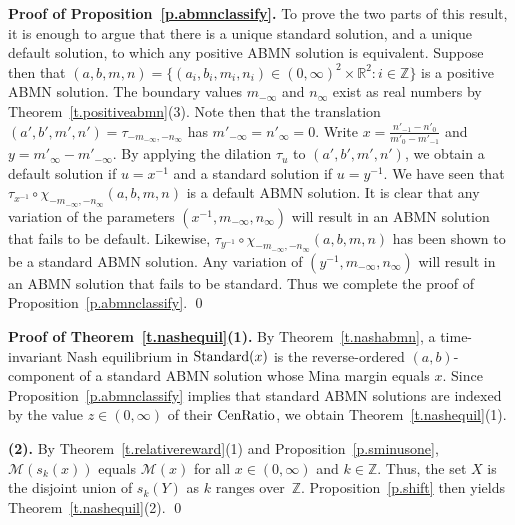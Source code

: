 \documentclass[letterpaper,11pt,oneside,reqno]{amsbook}
\newcommand{\R}{\ensuremath{\mathbb{R}}}
\newcommand{\Z}{\ensuremath{\mathbb{Z}}}
\numberwithin{figure}{chapter}
\theoremstyle{definition}
\theoremstyle{definition}
\theoremstyle{definition}
\theoremstyle{definition}
\theoremstyle{definition}
\newcommand{\standard}{{\rm Standard}}
\newcommand{\centralratio}{{\rm CenRatio}}
\newcommand{\minamm}{\mathcal{M}}
\newcommand{\transmap}{\chi}
\newcommand{\abmnmacspace}{\textrm{ABMN} }
\begin{document}
{\bf Proof of Proposition~\ref{p.abmnclassify}.}
To prove the two parts of this result, it is enough to argue that there is a unique standard solution, and a unique default solution, to which any positive \abmnmacspace solution is equivalent. Suppose then that $(a,b,m,n) = \big\{ (a_i,b_i,m_i,n_i) \in (0,\infty)^2 \times \R^2 : i \in \Z \big\}$ is a  positive \abmnmacspace solution. The boundary values $m_{-\infty}$ and $n_\infty$ exist as real numbers by Theorem~\ref{t.positiveabmn}(3).
Note then that the translation $(a',b',m',n')  = \tau_{-m_{-\infty},-n_\infty}$ has  $m'_{-\infty} = n'_\infty = 0$. Write $x = \frac{n'_{-1} - n'_0}{m'_0 - m'_{-1}}$
and $y =  m'_\infty - m'_{-\infty}$.
 By applying the dilation $\tau_u$ to  $(a',b',m',n')$, we obtain a default solution if $u = x^{-1}$ and a standard solution if $u = y^{-1}$.
 We have seen that $\tau_{x^{-1}} \circ \transmap_{-m_{-\infty},-n_\infty}(a,b,m,n)$ is a default \abmnmacspace solution. It is clear that any variation of the parameters $(x^{-1},m_{-\infty},n_\infty)$
 will result in an \abmnmacspace solution that fails to be default. Likewise,  $\tau_{y^{-1}} \circ \transmap_{-m_{-\infty},-n_\infty}(a,b,m,n)$ has been shown to be a standard \abmnmacspace solution.
 Any variation of  $(y^{-1},m_{-\infty},n_\infty)$ will result in an \abmnmacspace solution that fails to be standard. Thus we complete the proof of Proposition~\ref{p.abmnclassify}. \qed
 


  
{\bf Proof of Theorem~\ref{t.nashequil}(1).} By Theorem~\ref{t.nashabmn}, a time-invariant Nash equilibrium in $\standard(x)$
is the reverse-ordered $(a,b)$-component of a standard \abmnmacspace solution whose Mina margin equals $x$. Since Proposition~\ref{p.abmnclassify}
implies that standard \abmnmacspace solutions are indexed by the value $z \in (0,\infty)$ of their $\centralratio$, we obtain Theorem~\ref{t.nashequil}(1).

{\bf (2).} By Theorem~\ref{t.relativereward}(1) and Proposition~\ref{p.sminusone}, $\minamm(s_k(x))$ equals $\minamm(x)$ for all $x \in (0,\infty)$ and $k \in \Z$.
Thus, the set $X$ is the disjoint union of $s_k(Y)$ as $k$ ranges over~$\Z$. Proposition~\ref{p.shift} then yields Theorem~\ref{t.nashequil}(2). \qed
\end{document}
